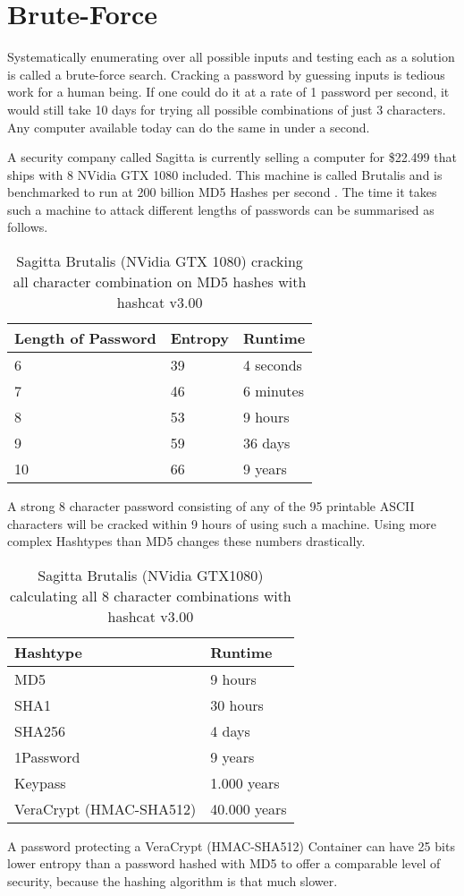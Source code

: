 \section{Brute-Force}

Systematically enumerating over all possible inputs and testing each as a solution is called a brute-force search. Cracking a password by guessing inputs is tedious work for a human being. If one could do it at a rate of 1 password per second, it would still take 10 days for trying all possible combinations of just 3 characters. Any computer available today can do the same in under a second.

A security company called Sagitta is currently selling a computer for \$22.499 that ships with 8 NVidia GTX 1080 included. This machine is called Brutalis and is benchmarked to run at 200 billion MD5 Hashes per second \cite{brutalis}. The time it takes such a machine to attack different lengths of passwords can be summarised as follows.

\begin{table}[h!]
\centering
\begin{tabular}{l l l}
	Length of Password	& Entropy 	& Runtime \\
	\hline
	6                   & 39 		& 4 seconds \\
	7                   & 46 		& 6 minutes \\
	8                   & 53 		& 9 hours \\
	9                   & 59 		& 36 days \\
	10                  & 66		& 9 years
\end{tabular}
\caption{Sagitta Brutalis (NVidia GTX 1080) cracking all character combination on MD5 hashes with hashcat v3.00}
\end{table}

A strong 8 character password consisting of any of the 95 printable ASCII characters will be cracked within 9 hours of using such a machine. Using more complex Hashtypes than MD5 changes these numbers drastically.

\begin{table}[h!]
\centering
\begin{tabular}{l l}
	Hashtype				& Runtime \\
	\hline
	MD5           			& 9 hours \\
	SHA1           			& 30 hours \\
	SHA256           		& 4 days \\
	1Password           	& 9 years \\
	Keypass          		& 1.000 years \\
	VeraCrypt (HMAC-SHA512)	& 40.000 years
\end{tabular}
\caption{Sagitta Brutalis (NVidia GTX1080) calculating all 8 character combinations with hashcat v3.00}
\end{table}

A password protecting a VeraCrypt (HMAC-SHA512) Container can have 25 bits lower entropy than a password hashed with MD5 to offer a comparable level of security, because the hashing algorithm is that much slower.

\newpage